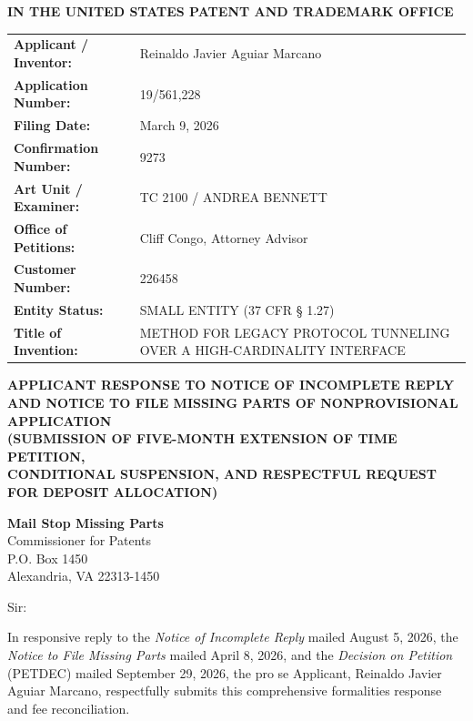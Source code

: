 \documentclass[11pt,letterpaper]{article}
\begin{document}
\thispagestyle{empty}

\begin{center}
    \textbf{\large IN THE UNITED STATES PATENT AND TRADEMARK OFFICE}
\end{center}

\vspace{0.3cm}
\noindent\begin{tabular}{p{2.3in}p{4.0in}}
\textbf{Applicant / Inventor:} & Reinaldo Javier Aguiar Marcano \\
\textbf{Application Number:} & 19/561,228 \\
\textbf{Filing Date:} & March 9, 2026 \\
\textbf{Confirmation Number:} & 9273 \\
\textbf{Art Unit / Examiner:} & TC 2100 / ANDREA BENNETT \\
\textbf{Office of Petitions:} & Cliff Congo, Attorney Advisor \\
\textbf{Customer Number:} & 226458 \\
\textbf{Entity Status:} & SMALL ENTITY (37 CFR \S{} 1.27) \\
\textbf{Title of Invention:} & METHOD FOR LEGACY PROTOCOL TUNNELING OVER A HIGH-CARDINALITY INTERFACE \\
\end{tabular}

\vspace{0.4cm}
\begin{center}
    \textbf{\large APPLICANT RESPONSE TO NOTICE OF INCOMPLETE REPLY \\
    AND NOTICE TO FILE MISSING PARTS OF NONPROVISIONAL APPLICATION} \\
    \textbf{\normalsize (SUBMISSION OF FIVE-MONTH EXTENSION OF TIME PETITION, \\
    CONDITIONAL SUSPENSION, AND RESPECTFUL REQUEST FOR DEPOSIT ALLOCATION)}
\end{center}

\noindent\textbf{Mail Stop Missing Parts} \\
Commissioner for Patents \\
P.O. Box 1450 \\
Alexandria, VA 22313-1450

\vspace{0.2cm}
Sir:

In responsive reply to the \textit{Notice of Incomplete Reply} mailed August 5, 2026, the \textit{Notice to File Missing Parts} mailed April 8, 2026, and the \textit{Decision on Petition} (PETDEC) mailed September 29, 2026, the pro se Applicant, Reinaldo Javier Aguiar Marcano, respectfully submits this comprehensive formalities response and fee reconciliation.
\end{document}
